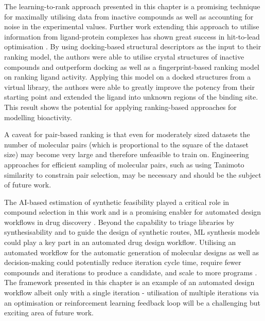 The learning-to-rank approach presented in this chapter is a promising technique for maximally utilising data from inactive compounds as well as accounting for noise in the experimental values. Further work extending this approach to utilise information from ligand-protein complexes has shown great success in hit-to-lead optimisation \cite{Saar2023pnas}. By using docking-based structural descriptors as the input to their ranking model, the authors were able to utilise crystal structures of inactive compounds and outperform docking as well as a fingerprint-based ranking model on ranking ligand activity. Applying this model on a docked structures from a virtual library, the authors were able to greatly improve the potency from their starting point and extended the ligand into unknown regions of the binding site. This result shows the potential for applying ranking-based approaches for modelling bioactivity.

A caveat for pair-based ranking is that even for moderately sized datasets the number of molecular pairs (which is proportional to the square of the dataset size) may become very large and therefore unfeasible to train on. Engineering approaches for efficient sampling of molecular pairs, such as using Tanimoto similarity to constrain pair selection, may be necessary and should be the subject of future work.

The AI-based estimation of synthetic feasibility played a critical role in compound selection in this work and is a promising enabler for automated design workflows in drug discovery \cite{Goldman2022ChemicalDesignLevels}. Beyond the capability to triage libraries by synthesisability and to guide the design of synthetic routes, ML synthesis models could play a key part in an automated drug design workflow. Utilising an automated workflow for the automatic generation of molecular designs as well as decision-making could potentially reduce iteration cycle time, require fewer compounds and iterations to produce a candidate, and scale to more programs \cite{Schneider2018AutomatingDrugDiscovery, Coley2020Outlook}. The framework presented in this chapter is an example of an automated design workflow albeit only with a single iteration - utilisation of multiple iterations via an optimisation \cite{korovina2019chembo} or reinforcement learning feedback loop \cite{born2019paccmannrl} will be a challenging but exciting area of future work.

